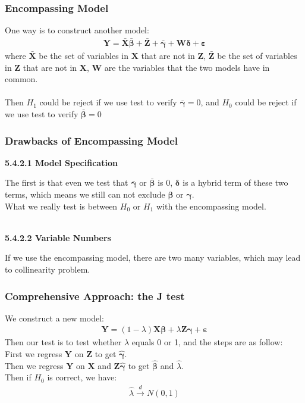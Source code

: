 \documentclass{article}
\begin{document}
\subsubsection{Encompassing Model}
One way is to construct another model:
	\begin{align*}
		\boldsymbol{Y} = \bar{\boldsymbol{X}} \bar{\boldsymbol{\beta}} + \bar{\boldsymbol{Z}} + \bar{\boldsymbol{\gamma}} + \boldsymbol{W} \boldsymbol{\delta} + \boldsymbol{\varepsilon}
	\end{align*}
where $\bar{\boldsymbol{X}}$ be the set of variables in $\boldsymbol{X}$ that are not in $\boldsymbol{Z}$, $\bar{\boldsymbol{Z}}$ be the set of variables in $\boldsymbol{Z}$ that are not in $\boldsymbol{X}$, $\boldsymbol{W}$ are the variables that the two models have in common.\\\\
Then $H_1$ could be reject if we use test to verify $\bar{\boldsymbol{\gamma}} = 0$, and $H_0$ could be reject if we use test to verify $\bar{\boldsymbol{\beta}} = 0$

\subsubsection{Drawbacks of Encompassing Model}
\centerline{\textbf{5.4.2.1 Model Specification}}
The first is that even we test that $\bar{\boldsymbol{\gamma}}$ or $\bar{\boldsymbol{\beta}}$ is 0, $\boldsymbol{\delta}$ is a hybrid term of these two terms, which means we still can not exclude $\boldsymbol{\beta}$ or $\boldsymbol{\gamma}$.\\
What we really test is between $H_0$ or $H_1$ with the encompassing model.\\\\
\centerline{\textbf{5.4.2.2 Variable Numbers}}
If we use the encompassing model, there are two many variables, which may lead to collinearity problem.

\subsubsection{Comprehensive Approach: the J test}
We construct a new model:
	\begin{align*}
		\boldsymbol{Y} = (1 - \lambda) \boldsymbol{X} \boldsymbol{\beta} + \lambda \boldsymbol{Z} \boldsymbol{\gamma} + \boldsymbol{\varepsilon}
	\end{align*}
Then our test is to test whether $\lambda$ equals 0 or 1, and the steps are as follow:\\
\indent First we regress $\boldsymbol{Y}$ on $\boldsymbol{Z}$ to get $\hat{\boldsymbol{\gamma}}$.\\
\indent Then we regress $\boldsymbol{Y}$ on $\boldsymbol{X}$ and $\boldsymbol{Z} \hat{\boldsymbol{\gamma}}$ to get $\hat{\boldsymbol{\beta}}$ and $\hat{\lambda}$.\\
\indent Then if $H_0$ is correct, we have:
	\begin{align*}
		\hat{\lambda} \xrightarrow{d} N(0, 1)
	\end{align*}
\end{document}
